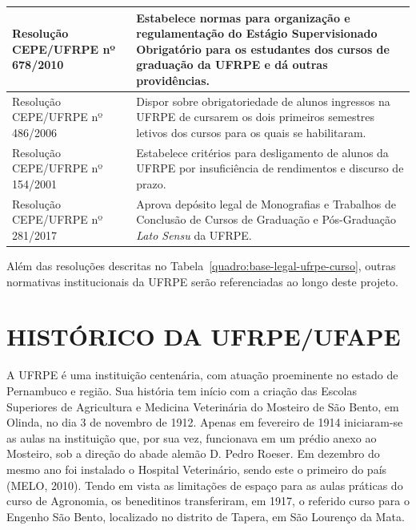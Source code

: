 \documentclass[
	12pt,				%
	openright,			%
  oneside,     %
	a4paper,			%
	english,			%
	french,				%
	spanish,			%
	brazil				%
	]{abntex2}
\begin{document}
\begin{center}
\begin{scriptsize}
\begin{longtable}{@{}lp{8.7cm}}
    Resolução CEPE/UFRPE nº 678/2010 & Estabelece normas para organização e regulamentação do Estágio Supervisionado Obrigatório para os estudantes dos cursos de graduação da UFRPE e dá outras providências. \\ \midrule
    Resolução CEPE/UFRPE nº 486/2006 & Dispor sobre obrigatoriedade de alunos ingressos na UFRPE de cursarem os dois primeiros semestres letivos dos cursos para os quais se habilitaram. \\ \midrule
    Resolução CEPE/UFRPE nº 154/2001 & Estabelece critérios para desligamento de alunos da UFRPE por insuficiência de rendimentos e discurso de prazo. \\ \midrule
    Resolução CEPE/UFRPE nº 281/2017 & Aprova depósito legal de Monografias e Trabalhos de Conclusão de Cursos de Graduação e Pós-Graduação \textit{Lato Sensu} da UFRPE.\\
    \bottomrule
    \end{longtable}
\end{scriptsize}     
\end{center}

Além das resoluções descritas no Tabela~\ref{quadro:base-legal-ufrpe-curso}, outras normativas institucionais da UFRPE serão referenciadas ao longo deste projeto.


\chapter{HISTÓRICO DA UFRPE/UFAPE}

A UFRPE é uma instituição centenária, com atuação proeminente no estado de Pernambuco e região. Sua história tem início com a criação das Escolas Superiores de Agricultura e Medicina Veterinária do Mosteiro de São Bento, em Olinda, no dia 3 de novembro de 1912. Apenas em fevereiro de 1914 iniciaram-se as aulas na instituição que, por sua vez, funcionava em um prédio anexo ao Mosteiro, sob a direção do abade alemão D. Pedro Roeser. Em dezembro do mesmo ano foi instalado o Hospital Veterinário, sendo este o primeiro do país (MELO, 2010). Tendo em vista as limitações de espaço para as aulas práticas do curso de Agronomia, os beneditinos transferiram, em 1917, o referido curso para o Engenho São Bento, localizado no distrito de Tapera, em São Lourenço da Mata.
\end{document}
